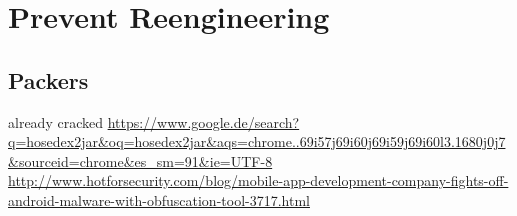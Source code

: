 \section{Prevent Reengineering} \label{section:evaluation-reengineering}


\subsection{Packers}
already cracked \url{https://www.google.de/search?q=hosedex2jar&oq=hosedex2jar&aqs=chrome..69i57j69i60j69i59j69i60l3.1680j0j7&sourceid=chrome&es_sm=91&ie=UTF-8}\newline
\url{http://www.hotforsecurity.com/blog/mobile-app-development-company-fights-off-android-malware-with-obfuscation-tool-3717.html}\newline
